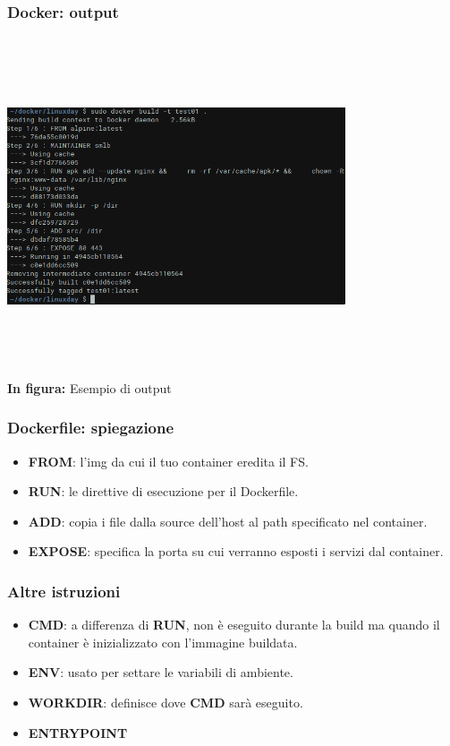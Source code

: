 \documentclass{beamer}
\begin{document}

\begin{frame}
    \frametitle{Docker: output}
    \begin{center}
        \includegraphics[width=10cm,height=10cm,keepaspectratio]{docker_output.png}
        \\ \textbf{In figura:} Esempio di output 
    \end{center}
\end{frame}


\begin{frame}
    \frametitle{Dockerfile: spiegazione}
    \begin{itemize}
        \item<1->\textbf{FROM}: l'img da cui il tuo container eredita il FS. 
        \item<2->\textbf{RUN}: le direttive di esecuzione per il Dockerfile.
        \item<3->\textbf{ADD}: copia i file dalla source dell'host al path specificato nel container.
        \item<4->\textbf{EXPOSE}: specifica la porta su cui verranno esposti i servizi dal container.
    \end{itemize}
\end{frame}


\begin{frame}    
    \frametitle{Altre istruzioni}
    \begin{itemize}
        \item<1-> \textbf{CMD}: a differenza di \textbf{RUN}, non \`e eseguito durante la build ma quando il container \`e inizializzato con l'immagine buildata.
        \item<2-> \textbf{ENV}: usato per settare le variabili di ambiente. 
        \item<3-> \textbf{WORKDIR}: definisce dove \textbf{CMD} sar\`a eseguito. 
        \item<4-> \textbf{ENTRYPOINT} 
    \end{itemize}
\end{frame}
\end{document}
